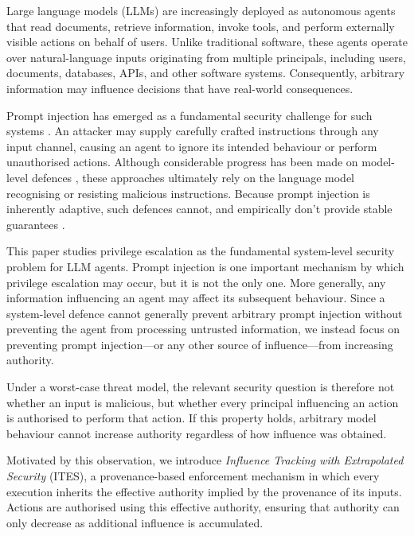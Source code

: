 \documentclass{article} %
\begin{document}
Large language models (LLMs) are increasingly deployed as autonomous agents that read documents, retrieve information, invoke tools, and perform externally visible actions on behalf of users. Unlike traditional software, these agents operate over natural-language inputs originating from multiple principals, including users, documents, databases, APIs, and other software systems. Consequently, arbitrary information may influence decisions that have real-world consequences.

Prompt injection has emerged as a fundamental security challenge for such systems \cite{rossi2024earlycategorizationpromptinjection}. An attacker may supply carefully crafted instructions through any input channel, causing an agent to ignore its intended behaviour or perform unauthorised actions. Although considerable progress has been made on model-level defences \cite{hines2024defendingindirectpromptinjection, chen2024struqdefendingpromptinjection, chen2025defendingpromptinjectiondefensivetokens, Chen_2025, liu2025datasentinelgametheoreticdetectionprompt}, these approaches ultimately rely on the language model recognising or resisting malicious instructions. Because prompt injection is inherently adaptive, such defences cannot, and empirically don't provide stable guarantees \cite{pasquini2024neuralexeclearningand, choudhary2025detectpromptinjectionsllm, Shao_2025, yang2025checkpointgcgauditingattackingfinetuningbased, jia2025criticalevaluationdefensesprompt}.

This paper studies privilege escalation as the fundamental system-level security problem for LLM agents. Prompt injection is one important mechanism by which privilege escalation may occur, but it is not the only one. More generally, any information influencing an agent may affect its subsequent behaviour. Since a system-level defence cannot generally prevent arbitrary prompt injection without preventing the agent from processing untrusted information, we instead focus on preventing prompt injection---or any other source of influence---from increasing authority.

Under a worst-case threat model, the relevant security question is therefore not whether an input is malicious, but whether every principal influencing an action is authorised to perform that action. If this property holds, arbitrary model behaviour cannot increase authority regardless of how influence was obtained.

Motivated by this observation, we introduce \emph{Influence Tracking with Extrapolated Security} (ITES), a provenance-based enforcement mechanism in which every execution inherits the effective authority implied by the provenance of its inputs. Actions are authorised using this effective authority, ensuring that authority can only decrease as additional influence is accumulated.
\end{document}
